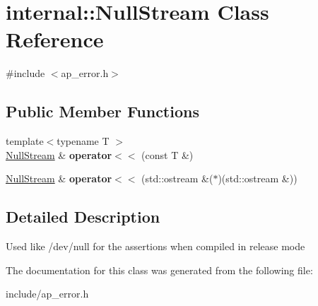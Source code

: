 \hypertarget{classinternal_1_1NullStream}{}\section{internal\+:\+:Null\+Stream Class Reference}
\label{classinternal_1_1NullStream}


{\ttfamily \#include $<$ap\+\_\+error.\+h$>$}

\subsection*{Public Member Functions}
\begin{DoxyCompactItemize}
\item 
\mbox{\label{classinternal_1_1NullStream_aa34fad2e3e043e27c7ae24ca910151e7}} 
{\footnotesize template$<$typename T $>$ }\\\hyperlink{classinternal_1_1NullStream}{Null\+Stream} \& {\bfseries operator$<$$<$} (const T \&)
\item 
\mbox{\label{classinternal_1_1NullStream_af5ec05d4b30674b1313ab5f70bbfdcd7}} 
\hyperlink{classinternal_1_1NullStream}{Null\+Stream} \& {\bfseries operator$<$$<$} (std\+::ostream \&($\ast$)(std\+::ostream \&))
\end{DoxyCompactItemize}


\subsection{Detailed Description}
Used like /dev/null for the assertions when compiled in release mode 

The documentation for this class was generated from the following file\+:\begin{DoxyCompactItemize}
\item 
include/ap\+\_\+error.\+h\end{DoxyCompactItemize}
